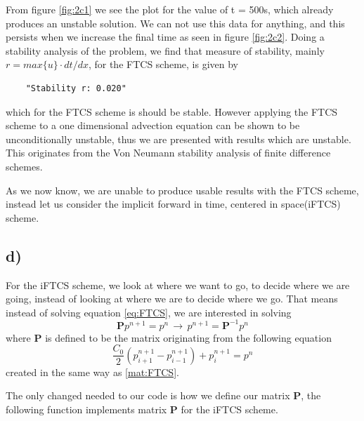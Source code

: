 \documentclass[10pt, a4paper]{amsart}
\begin{document}
From figure \ref{fig:2c1} we see the plot for the value of t = 500s, which already produces an unstable solution. We can not use this data for anything, and this persists when we increase the final time as seen in figure \ref{fig:2c2}. Doing a stability analysis of the problem, we find that measure of stability, mainly $r = max\lbrace u\rbrace \cdot dt / dx$, for the FTCS scheme, is given by 
\begin{lstlisting}
	"Stability r: 0.020"
\end{lstlisting}
which for the FTCS scheme is should be stable. However applying the FTCS scheme to a one dimensional advection equation can be shown to be unconditionally unstable, thus we are presented with results which are unstable. This originates from the Von Neumann stability analysis of finite difference schemes\cite{lev02}. 

As we now know, we are unable to produce usable results with the FTCS scheme, instead let us consider the implicit forward in time, centered in space(iFTCS) scheme.  

\subsection{d)}
For the iFTCS scheme, we look at where we want to go, to decide where we are going, instead of looking at where we are to decide where we go. That means instead of solving equation \ref{eq:FTCS}, we are interested in solving 
\begin{equation}
	\mathbf{P}p^{n+1} = p^n\, \longrightarrow\, p^{n+1} = \mathbf{P}^{-1}p^n
\end{equation}
where $\mathbf{P}$ is defined to be the matrix originating from the following equation 
\begin{equation}
	\frac{C_0}{2}\left(p_{i+1}^{n+1}-p_{i-1}^{n+1}\right) + p_i^{n+1}= p^n
\end{equation}
created in the same way as \ref{mat:FTCS}.

The only changed needed to our code is how we define our matrix $\mathbf{P}$, the following function implements matrix $\mathbf{P}$ for the iFTCS scheme.

\end{document}
